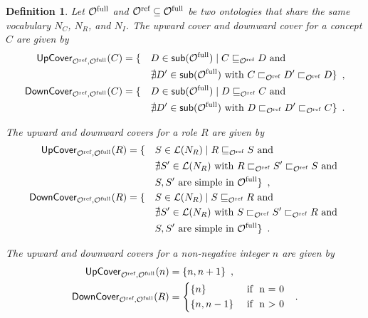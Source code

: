 \documentclass[
]{ceurart}
\newtheorem{definition}{Definition}
\begin{document}
\begin{definition} \label{def:covers}
  Let ${\mathcal{O}^\textnormal{full}}$ and ${\mathcal{O}^\textnormal{ref}} \subseteq {\mathcal{O}^\textnormal{full}}$ be two \SROIQ ontologies that share the same vocabulary $N_C$, $N_R$, and $N_I$. The \emph{upward cover} and \emph{downward cover} for a concept $C$ are given by
  \begin{alignat*}{2}
    {\ensuremath{\mathsf{UpCover}}}_{{\mathcal{O}^\textnormal{ref}},{\mathcal{O}^\textnormal{full}}}(C) &= \{ &&D \in \mathop{\mathsf{sub}}({\mathcal{O}^\textnormal{full}}) \mid C \sqsubseteq_{\mathcal{O}^\textnormal{ref}} D \text{ and } \\
    &&&\nexists D' \in \mathop{\mathsf{sub}}({\mathcal{O}^\textnormal{full}}) \text{ with } C \sqsubset_{\mathcal{O}^\textnormal{ref}} D' \sqsubset_{\mathcal{O}^\textnormal{ref}} D \} \enspace, \\
    {\mathsf{DownCover}}_{{\mathcal{O}^\textnormal{ref}},{\mathcal{O}^\textnormal{full}}}(C) &= \{ &&D \in \mathop{\mathsf{sub}}({\mathcal{O}^\textnormal{full}}) \mid D \sqsubseteq_{\mathcal{O}^\textnormal{ref}} C \text{ and } \\
    &&&\nexists D' \in \mathop{\mathsf{sub}}({\mathcal{O}^\textnormal{full}}) \text{ with } D \sqsubset_{\mathcal{O}^\textnormal{ref}} D' \sqsubset_{\mathcal{O}^\textnormal{ref}} C \} \enspace.
  \end{alignat*}

  The upward and downward covers for a role $R$ are given by
  \begin{alignat*}{2}
    {\ensuremath{\mathsf{UpCover}}}_{{\mathcal{O}^\textnormal{ref}},{\mathcal{O}^\textnormal{full}}}(R) &= \{ &&S \in \mathcal{L}(N_R) \mid R \sqsubseteq_{\mathcal{O}^\textnormal{ref}} S \text{ and } \\
    &&& \nexists S' \in \mathcal{L}(N_R) \text{ with } R \sqsubset_{\mathcal{O}^\textnormal{ref}} S' \sqsubset_{\mathcal{O}^\textnormal{ref}} S \text{ and } \\
    &&& S, S' \text{ are simple in } {\mathcal{O}^\textnormal{full}} \} \enspace, \\
    {\mathsf{DownCover}}_{{\mathcal{O}^\textnormal{ref}},{\mathcal{O}^\textnormal{full}}}(R) &= \{ &&S \in \mathcal{L}(N_R) \mid S \sqsubseteq_{\mathcal{O}^\textnormal{ref}} R \text{ and } \\
    &&&\nexists S' \in \mathcal{L}(N_R) \text{ with } S \sqsubset_{\mathcal{O}^\textnormal{ref}} S' \sqsubset_{\mathcal{O}^\textnormal{ref}} R \text{ and } \\
    &&& S, S' \text{ are simple in } {\mathcal{O}^\textnormal{full}} \} \enspace.
  \end{alignat*}

  The upward and downward covers for a non-negative integer $n$ are given by
  \begin{alignat*}{2}
    \UpC_{\Omcref,\Omcfull}(n) &= \{ n, n + 1 \} \enspace, \\
    \DownC_{\Omcref,\Omcfull}(R) &=
    \begin{cases*}
      \{ n \} & \text{ if } n = 0 \\
      \{ n, n - 1 \} & \text{ if } n > 0
    \end{cases*} \enspace.
  \end{alignat*}
\end{definition}
\end{document}
